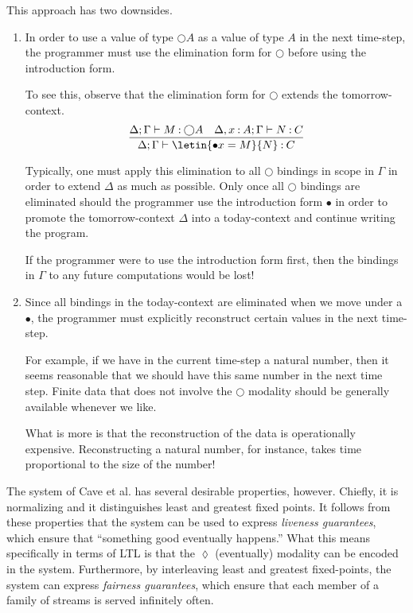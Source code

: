\documentclass[acmsmall, natbib=false]{acmart}
\renewcommand{\circle}{\bigcirc}
\newcommand{\eventually}{\lozenge}
\begin{document}
This approach has two downsides.
%
\begin{enumerate}
  \item
    In order to use a value of type $\circle A$ as a value of type $A$ in the
    next time-step, the programmer must use the elimination form for $\circle$
    before using the introduction form.

    To see this, observe that the elimination form for $\circle$ extends
    the tomorrow-context.
    \begin{equation*}
      \infer{
        \Delta;\Gamma \proves \letin{\bullet x = M}{N} \hastype C
      }{
        \Delta;\Gamma \proves M \hastype \circle A
        &
        \Delta, x\hastype A; \Gamma \proves N \hastype C
      }
    \end{equation*}

    Typically, one must apply this elimination to all $\circle$ bindings in
    scope in $\Gamma$ in order to extend $\Delta$ as much as possible.
    Only once all $\circle$ bindings are eliminated should the programmer use
    the introduction form $\bullet$ in order to promote the tomorrow-context
    $\Delta$ into a today-context and continue writing the program.

    If the programmer were to use the introduction form first, then the
    bindings in $\Gamma$ to any future computations would be lost!

  \item
    Since all bindings in the today-context are eliminated when we move under a
    $\bullet$, the programmer must explicitly reconstruct certain values in the
    next time-step.

    For example, if we have in the current time-step a natural number, then it
    seems reasonable that we should have this same number in the next time
    step. Finite data that does not involve the $\circle$ modality should be
    generally available whenever we like.

    What is more is that the reconstruction of the data is operationally
    expensive. Reconstructing a natural number, for instance, takes time
    proportional to the size of the number!
\end{enumerate}

The system of Cave et al. has several desirable properties, however.
Chiefly, it is normalizing and it distinguishes least and greatest fixed
points.
It follows from these properties that the system can be used to express
\emph{liveness guarantees}, which ensure that ``something good eventually
happens.'' What this means specifically in terms of LTL is that the
$\eventually$ (eventually) modality can be encoded in the system.
Furthermore, by interleaving least and greatest fixed-points, the system can
express \emph{fairness guarantees}, which ensure that each member of a family
of streams is served infinitely often.
\end{document}
